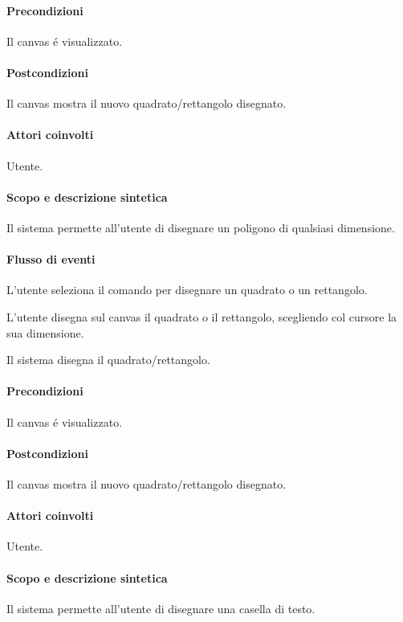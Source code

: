 \paragraph{Precondizioni} Il canvas \'e visualizzato.
\paragraph{Postcondizioni} Il canvas mostra il nuovo quadrato/rettangolo disegnato.

\paragraph{Attori coinvolti} Utente.
\paragraph{Scopo e descrizione sintetica} 
Il sistema permette all'utente di disegnare un poligono di qualsiasi dimensione.
\paragraph{Flusso di eventi}
\begin{elenconumerato}[\textbf{}]{\subsubsecindent}
\item L'utente seleziona il comando per disegnare un quadrato o un rettangolo.
\item L'utente disegna sul canvas il quadrato o il rettangolo, scegliendo col cursore la sua dimensione.
\item Il sistema disegna il quadrato/rettangolo.
\end{elenconumerato}
\paragraph{Precondizioni} Il canvas \'e visualizzato.
\paragraph{Postcondizioni} Il canvas mostra il nuovo quadrato/rettangolo disegnato.

\paragraph{Attori coinvolti} Utente.
\paragraph{Scopo e descrizione sintetica} 
Il sistema permette all'utente di disegnare una casella di testo.
